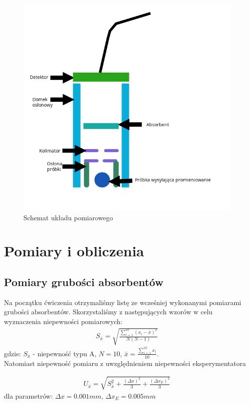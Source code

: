 \documentclass[a4paper]{article}
\newlength{\du}
\begin{document}
\begin{figure}[h!]
\centering
\includegraphics[scale=0.6]{schemat_ukladu}
\caption{Schemat układu pomiarowego}
\label{uklad_pomiarowy}
\end{figure}


\section{Pomiary i obliczenia}
\subsection{Pomiary grubości absorbentów}
Na początku ćwiczenia otrzymaliśmy listę ze wcześniej wykonanymi pomiarami grubości absorbentów. Skorzystaliśmy z następujących wzorów w  celu wyznaczenia niepewności pomiarowych: 
\begin{align*}
S_{\bar{x}} = \sqrt{\frac{\sum_{i=1}^{10}(x_i-\bar{x})^2}{N(N-1)}}
\end{align*}
gdzie: $S_{\bar{x}}$ - niepewność typu A, $N = 10$, $\bar{x} = \frac{\sum_{i=1}^{10}x_i}{10}$. \\
Natomiast niepewność pomiaru z uwzględnieniem niepewności eksperymentatora

\begin{align*}
U_{\bar{x}} = \sqrt{S_{\bar{x}}^2 + \frac{(\Delta x)^2}{3} + \frac{(\Delta x_E)^2}{3}}
\end{align*}
dla parametrów: $\Delta x = 0.001 mm$, $\Delta x_E = 0.005 mm$
\end{document}
